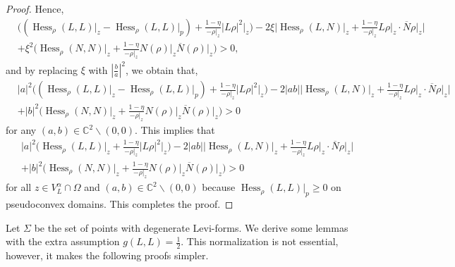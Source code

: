 \documentclass[11pt]{article}
\theoremstyle{plain} \numberwithin{equation}{section}
\theoremstyle{definition}
\DeclareMathOperator{\Hessian}{Hess}
\begin{document}
\begin{proof}
	 Hence,  \[\begin{split}
	 &\Big((\Hessian_\rho(L, L)\vert_z-\Hessian_\rho(L, L)\vert_p)+\frac{1-\eta}{-\rho\vert_z}|L\rho|^2\vert_z\Big)-2\xi \Big|\Hessian_\rho (L, N)\vert_z+\frac{1-\eta}{-\rho\vert_z}L\rho\vert_z\cdot\overline{N}\rho\vert_z\Big|\\&+\xi^2 \Big(\Hessian_\rho (N, N)\vert_z+\frac{1-\eta}{-\rho\vert_z}N(\rho)\vert_z\overline{N} (\rho)\vert_z\Big)>0,
	 \end{split}\] and by replacing $\xi$ with $\left|\frac{b}{a}\right|^2$, we obtain that,
	 \[\begin{split}
	 &|a|^2\Big((\Hessian_\rho(L, L)\vert_z-\Hessian_\rho(L, L)\vert_p)+\frac{1-\eta}{-\rho\vert_z}|L\rho|^2\vert_z\Big)-2|ab| \Big|\Hessian_\rho (L, N)\vert_z+\frac{1-\eta}{-\rho\vert_z}L\rho\vert_z\cdot\overline{N}\rho\vert_z\Big|\\&+|b|^2 \Big(\Hessian_\rho (N, N)\vert_z+\frac{1-\eta}{-\rho\vert_z}N(\rho)\vert_z\overline{N} (\rho)\vert_z\Big)>0
	 \end{split}\] for any $(a,b)\in\mathbb{C}^2\backslash(0,0)$. This implies that \[\begin{split}
	 &|a|^2\Big(\Hessian_\rho(L, L)\vert_z+\frac{1-\eta}{-\rho\vert_z}|L\rho|^2\vert_z\Big)-2|ab| \Big|\Hessian_\rho (L, N)\vert_z+\frac{1-\eta}{-\rho\vert_z}L\rho\vert_z\cdot\overline{N}\rho\vert_z\Big|\\&+|b|^2 \Big(\Hessian_\rho (N, N)\vert_z+\frac{1-\eta}{-\rho\vert_z}N(\rho)\vert_z\overline{N} (\rho)\vert_z\Big)>0
	 \end{split}\] for all $z\in V^\alpha_L\cap\Omega$ and $(a,b)\in\mathbb{C}^2\backslash(0,0)$ because $\Hessian_\rho(L, L)\vert_p\geq 0$ on pseudoconvex domains. This completes the proof.
\end{proof}


Let $\Sigma$ be the set of points with degenerate Levi-forms. We derive some lemmas with the extra assumption $g(L, L)=\frac{1}{2}$. This normalization is not essential, however, it makes the following proofs simpler.
\end{document}
